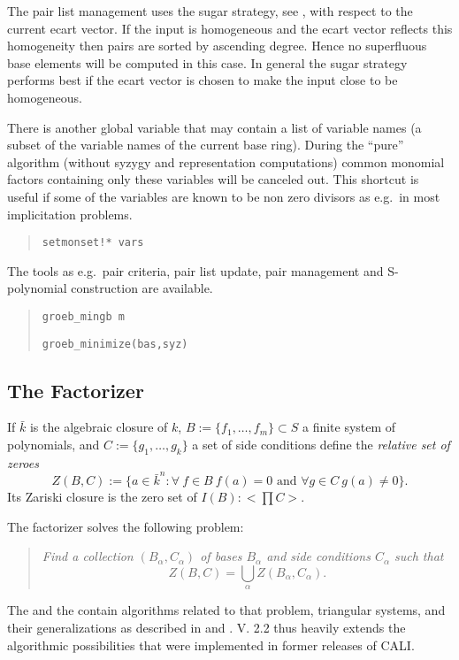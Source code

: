The pair list management uses the sugar strategy, see \cite{GMNRT},
with respect to the current ecart vector. If the input is homogeneous
and the ecart vector reflects this homogeneity then pairs are sorted
by ascending degree. Hence no superfluous base
elements will be computed in this case. In general the sugar strategy
performs best if the ecart vector is chosen to make the input close
to be homogeneous.

There is another global variable  that may contain
a list of variable names (a subset of the variable names of the
current base ring). During the ``pure'' \gr algorithm (without syzygy
and representation computations) common monomial factors containing
only these variables will be canceled out. This shortcut is useful if
some of the variables are known to be non zero divisors as e.g.\ in
most implicitation problems.
\begin{quote}
\verb|setmonset!* vars|

\end{quote}

The \gr tools as e.g.\ pair criteria, pair list update, pair
management and S-polynomial construction are available.
\begin{quote}
\verb|groeb_mingb m|


\verb|groeb_minimize(bas,syz)|

\end{quote}

\subsection{The \gr Factorizer}

If $\bar{k}$ is the algebraic closure of $k$,
$B:=\{f_1,\ldots,f_m\}\subset S$ a finite system of polynomials, and
$C:=\{g_1,\ldots,g_k\}$ a set of side conditions define the {\em
relative set of zeroes}
\[Z(B,C):=\{a\in \bar{k}^n : \forall\ f\in B\ f(a)=0\mbox{ and }
\forall g\in C\ g(a)\neq 0\}.\]
Its Zariski closure is the zero set of $I(B):<\prod C>$.

The \gr factorizer solves the following problem:
\begin{quote}
\it Find a collection $(B_\alpha,C_\alpha)$ of \gr bases $B_\alpha$
and side conditions $C_\alpha$ such that
\[Z(B,C) = \bigcup_\alpha Z(B_\alpha,C_\alpha).\]
\end{quote}
The  and the  contain algorithms
related to that problem, triangular systems, and their generalizations
as described in \cite{fgb} and \cite{efgb}. V. 2.2 thus heavily
extends the algorithmic possibilities that were implemented in former
releases of CALI.

